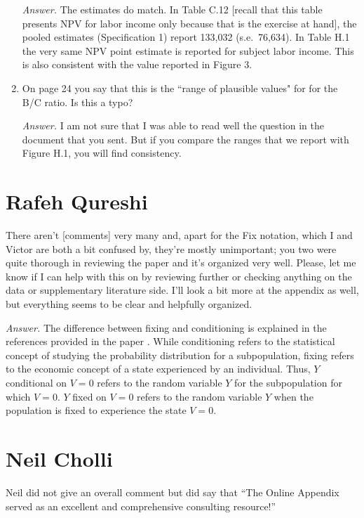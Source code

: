 \begin{enumerate}
\noindent \textit{Answer.} The estimates do match. In Table C.12 [recall that this table presents NPV for labor income only because that is the exercise at hand], the pooled estimates (Specification 1) report 133,032 (s.e.\ 76,634). In Table H.1 the very same NPV point estimate is reported for subject labor income. This is also consistent with the value reported in Figure 3. 

\item On page 24 you say that this is the ``range of plausible values" for for the B/C ratio. Is this a typo? 

\noindent \textit{Answer.}  I am not sure that I was able to read well the question in the document that you sent. But if you compare the ranges that we report with Figure H.1, you will find consistency.
\end{enumerate}

\section*{Rafeh Qureshi}

There aren't [comments] very many and, apart for the Fix notation, which I and Victor are both a bit confused by, they're mostly unimportant; you two were quite thorough in reviewing the paper and it's organized very well. Please, let me know if I can help with this on by reviewing further or checking anything on the data or supplementary literature side. I'll look a bit more at the appendix as well, but everything seems to be clear and helpfully organized.

\textit{Answer.} The difference between fixing and conditioning is explained in the references provided in the paper \citep{Heckman_Pinto_2015_EconometTheory}. While conditioning refers to the statistical concept of studying the probability distribution for a subpopulation, fixing refers to the economic concept of a state experienced by an individual. Thus, $Y$ conditional on $V = 0$ refers to the random variable $Y$ for the subpopulation for which $V = 0$. $Y$ fixed on $V = 0$ refers to the random variable $Y$ when the population is fixed to experience the state $V = 0$.

\section*{Neil Cholli}

Neil did not give an overall comment but did say that ``The Online Appendix served as an excellent and comprehensive consulting resource!''

